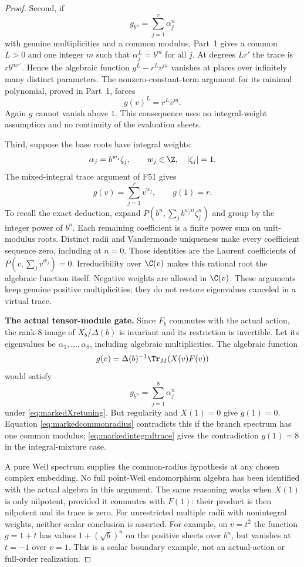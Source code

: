 \documentclass[11pt,a4paper]{article}
\newcommand{\fid}[1]{\textsf{#1}}\newcommand{\gate}[1]{\textsf{#1}}
\theoremstyle{named}\newtheorem{finding}{Finding}[section]
\theoremstyle{definition}\newtheorem{definition}[finding]{Definition}
\theoremstyle{remark}\newtheorem{remark}[finding]{Remark}
\begin{document}
\begin{proof}
Second, if
\[
 g_{b^n}=\sum_{j=1}^r\alpha_j^n
\]
with genuine multiplicities and a common modulus,
Part~1 gives a common $L>0$ and one integer $m$ such that
$\alpha_j^L=b^m$ for all $j$.
At degrees $Lr'$ the trace is $r b^{mr'}$.
Hence the algebraic function $g^L-r^L v^m$ vanishes
at places over infinitely many distinct parameters.
The nonzero-constant-term argument for its minimal
polynomial, proved in Part~1, forces
\begin{equation}\label{eq:markedcommonradius}
 g(v)^L=r^L v^m.
\end{equation}
Again $g$ cannot vanish above $1$.
This consequence uses no integral-weight assumption
and no continuity of the evaluation sheets.

Third, suppose the base roots have integral weights:
\[
 \alpha_j=b^{w_j}\zeta_j,\qquad
 w_j\in\Z,\quad |\zeta_j|=1.
\]
The mixed-integral trace argument of \fid{F51} gives
\begin{equation}\label{eq:markedintegraltrace}
 g(v)=\sum_{j=1}^r v^{w_j},\qquad g(1)=r.
\end{equation}
To recall the exact deduction, expand
$P(b^n,\sum_j b^{w_jn}\zeta_j^n)$ and group by the
integer power of $b^n$.
Each remaining coefficient is a finite power sum
on unit-modulus roots.
Distinct radii and Vandermonde uniqueness make every
coefficient sequence zero, including at $n=0$.
Those identities are the Laurent coefficients of
$P(v,\sum_jv^{w_j})=0$.
Irreducibility over $\C(v)$ makes this rational root
the algebraic function itself.
Negative weights are allowed in $\C(v)$.
These arguments keep genuine positive multiplicities;
they do not restore eigenvalues canceled in a virtual trace.

\par\smallskip\noindent\textbf{The actual tensor-module gate.}\quad
Since $F_b$ commutes with the actual action,
the rank-$8$ image of $X_b/\Delta(b)$ is invariant
and its restriction is invertible.
Let its eigenvalues be $\alpha_1,\ldots,\alpha_8$,
including algebraic multiplicities.
The algebraic function
\[
 g(v)=\Delta(b)^{-1}\Tr_M(X(v)F(v))
\]
would satisfy
\[
 g_{b^n}=\sum_{j=1}^8\alpha_j^n
\]
under \eqref{eq:markedXretuning}.
But regularity and $X(1)=0$ give $g(1)=0$.
Equation \eqref{eq:markedcommonradius} contradicts this
if the branch spectrum has one common modulus;
\eqref{eq:markedintegraltrace} gives the contradiction
$g(1)=8$ in the integral-mixture case.

A pure Weil spectrum supplies the common-radius hypothesis
at any chosen complex embedding.
No full point-Weil endomorphism algebra has been identified
with the actual algebra in this argument.
The same reasoning works when $X(1)$ is only nilpotent,
provided it commutes with $F(1)$:
their product is then nilpotent and its trace is zero.
For unrestricted multiple radii with nonintegral weights,
neither scalar conclusion is asserted.
For example, on $v=t^2$ the function $g=1+t$ has values
$1+(\sqrt b)^n$ on the positive sheets over $b^n$,
but vanishes at $t=-1$ over $v=1$.
This is a scalar boundary example, not an actual-action
or full-order realization.


\end{proof}
\end{document}
